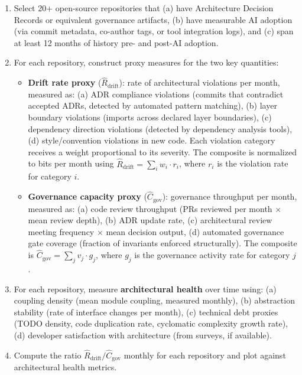 \documentclass[11pt, a4paper, logo, copyright]{googledeepmind}
\begin{document}
\begin{enumerate}[nosep]
    \item Select 20+ open-source repositories that (a) have Architecture Decision Records or equivalent governance artifacts, (b) have measurable AI adoption (via commit metadata, co-author tags, or tool integration logs), and (c) span at least 12 months of history pre- and post-AI adoption.
    \item For each repository, construct proxy measures for the two key quantities:
    \begin{itemize}[nosep]
        \item \textbf{Drift rate proxy} ($\hat{R}_{\text{drift}}$): rate of architectural violations per month, measured as: (a) ADR compliance violations (commits that contradict accepted ADRs, detected by automated pattern matching), (b) layer boundary violations (imports across declared layer boundaries), (c) dependency direction violations (detected by dependency analysis tools), (d) style/convention violations in new code. Each violation category receives a weight proportional to its severity. The composite is normalized to bits per month using $\hat{R}_{\text{drift}} = \sum_i w_i \cdot r_i$, where $r_i$ is the violation rate for category $i$.
        \item \textbf{Governance capacity proxy} ($\hat{C}_{\text{gov}}$): governance throughput per month, measured as: (a) code review throughput (PRs reviewed per month $\times$ mean review depth), (b) ADR update rate, (c) architectural review meeting frequency $\times$ mean decision output, (d) automated governance gate coverage (fraction of invariants enforced structurally). The composite is $\hat{C}_{\text{gov}} = \sum_j v_j \cdot g_j$, where $g_j$ is the governance activity rate for category $j$.
    \end{itemize}
    \item For each repository, measure \textbf{architectural health} over time using: (a) coupling density (mean module coupling, measured monthly), (b) abstraction stability (rate of interface changes per month), (c) technical debt proxies (TODO density, code duplication rate, cyclomatic complexity growth rate), (d) developer satisfaction with architecture (from surveys, if available).
    \item Compute the ratio $\hat{R}_{\text{drift}} / \hat{C}_{\text{gov}}$ monthly for each repository and plot against architectural health metrics.
\end{enumerate}
\end{document}
